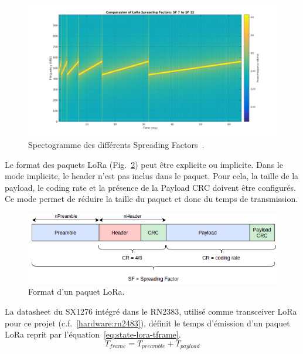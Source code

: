 \begin{figure}[H]
    \centering
    \includegraphics[scale=0.25]{res/pictures/lora-sf.png}
    \caption{Spectogramme des différents Spreading Factors~\cite{ghoslya}.}
    \label{fig:state-sf}
\end{figure}



\vspace{1cm}
Le format des paquets LoRa (Fig.~\ref{fig:state-lora-frame-format}) peut être explicite ou implicite.
Dans le mode implicite, le header n'est pas inclus dans le paquet. Pour cela, la taille de la payload, le coding rate et la présence de la Payload CRC doivent être configurés.
Ce mode permet de réduire la taille du paquet et donc du temps de transmission.

\begin{figure}[H]
    \centering
    \includegraphics[scale=0.6]{res/pictures/lora-frame-format.drawio.png}
    \caption{Format d'un paquet LoRa.}
    \label{fig:state-lora-frame-format}
\end{figure}

La datasheet du SX1276 intégré dans le RN2383, utilisé comme transceiver LoRa pour ce projet (c.f.~\ref{hardware:rn2483}), définit le temps d'émission d'un paquet LoRa reprit par l'équation~\ref{eq:state-lora-tframe}.
\begin{equation}\label{eq:state-lora-tframe}
    T_{frame} = T_{preamble} + T_{payload}
\end{equation}

